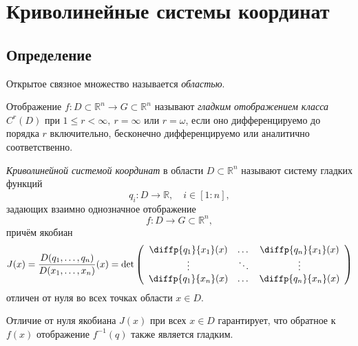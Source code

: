 \section{Криволинейные системы координат}

\subsection{Определение}

\begin{definition}
  Открытое связное множество называется \textit{областью}.
\end{definition}

\begin{definition}
  Отображение $f : D \subset \mathbb{R}^n \to G \subset \mathbb{R}^n$ называют
  \textit{гладким отображением класса $C^r(D)$} при
  $1 \leqslant r < \infty,~r = \infty$ или $r = \omega$, если оно
  дифференцируемо до порядка $r$ включительно, бесконечно дифференцируемо или
  аналитично соответственно.
\end{definition}

\begin{definition}
  \textit{Криволинейной системой координат} в области $D \subset \mathbb{R}^n$
  называют систему гладких функций
  \begin{equation*}
    q_i : D \to \mathbb{R}, \quad i \in [1:n],
  \end{equation*}
  задающих взаимно однозначное отображение
  \begin{equation*}
    f : D \to G \subset \mathbb{R}^n,
  \end{equation*}
  причём якобиан
  \begin{equation}
    J(x) = \frac{D(q_1, \dots, q_n)}{D(x_1, \dots, x_n)}(x) = \det
    \left(
    \begin{array}{c c c}
      \diffp{q_1}{{x_1}}(x) & \dots & \diffp{q_n}{{x_1}}(x) \\
      \vdots & \ddots & \vdots \\
      \diffp{q_1}{{x_n}}(x) & \dots & \diffp{q_n}{{x_n}}(x)
    \end{array}
    \right)
  \end{equation}
  отличен от нуля во всех точках области $x \in D$.
\end{definition}

\begin{remark}
  Отличие от нуля якобиана $J(x)$ при всех $x \in D$ гарантирует, что обратное
  к $f(x)$ отображение $f^{-1}(q)$ также является гладким.
\end{remark}

